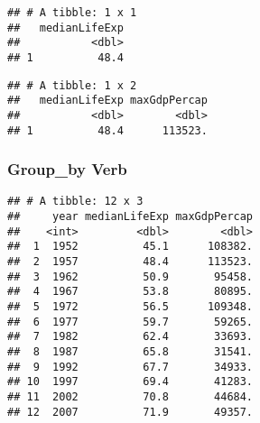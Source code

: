 \documentclass[
]{article}
\newenvironment{Shaded}{\begin{snugshade}}{\end{snugshade}}
\newcommand{\CommentTok}[1]{\textcolor[rgb]{0.56,0.35,0.01}{\textit{#1}}}
\newcommand{\DataTypeTok}[1]{\textcolor[rgb]{0.13,0.29,0.53}{#1}}
\newcommand{\DecValTok}[1]{\textcolor[rgb]{0.00,0.00,0.81}{#1}}
\newcommand{\KeywordTok}[1]{\textcolor[rgb]{0.13,0.29,0.53}{\textbf{#1}}}
\newcommand{\NormalTok}[1]{#1}
\newcommand{\OperatorTok}[1]{\textcolor[rgb]{0.81,0.36,0.00}{\textbf{#1}}}
\newcommand{\StringTok}[1]{\textcolor[rgb]{0.31,0.60,0.02}{#1}}
\begin{document}
\begin{verbatim}
## # A tibble: 1 x 1
##   medianLifeExp
##           <dbl>
## 1          48.4
\end{verbatim}

\begin{Shaded}
\end{Shaded}

\begin{verbatim}
## # A tibble: 1 x 2
##   medianLifeExp maxGdpPercap
##           <dbl>        <dbl>
## 1          48.4      113523.
\end{verbatim}

\hypertarget{group_by-verb}{%
\subsubsection{Group\_by Verb}\label{group_by-verb}}

\begin{Shaded}
\end{Shaded}

\begin{verbatim}
## # A tibble: 12 x 3
##     year medianLifeExp maxGdpPercap
##    <int>         <dbl>        <dbl>
##  1  1952          45.1      108382.
##  2  1957          48.4      113523.
##  3  1962          50.9       95458.
##  4  1967          53.8       80895.
##  5  1972          56.5      109348.
##  6  1977          59.7       59265.
##  7  1982          62.4       33693.
##  8  1987          65.8       31541.
##  9  1992          67.7       34933.
## 10  1997          69.4       41283.
## 11  2002          70.8       44684.
## 12  2007          71.9       49357.
\end{verbatim}
\end{document}
